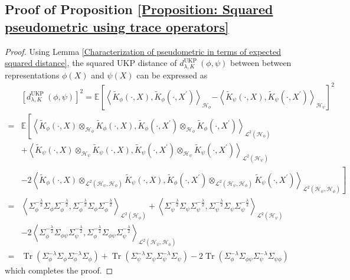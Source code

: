 \documentclass[11pt]{article}
\newcommand{\E}{\mathbb{E}}
\newcommand{\HS}{\mathcal{L}^{2}}
\newcommand{\repone}{\phi}
\newcommand{\reptwo}{\psi}
\newcommand{\Hone}{\mathcal{H}_{\phi}}
\newcommand{\Htwo}{\mathcal{H}_{\psi}}
\newcommand{\inprod}[1]{\left \langle #1 \right\rangle}
\DeclareMathOperator*{\Tr}{\text{Tr}}
\newcommand{\metricstname}{UKP }
\theoremstyle{plain}
\begin{document}
\subsection{Proof of Proposition \ref{Proposition: Squared pseudometric using trace operators}}\label{Proof of Proposition 1}

\begin{proof}
    Using Lemma \ref{Characterization of pseudometric in terms of expected squared distance}, the squared \metricstname distance of $d_{\lambda,K}^{\text{\metricstname}}(\repone,\reptwo)$ between between representations $\repone(X)$ and $\reptwo(X)$ can be expressed as
    \[
    \begin{aligned}
        &\left[d_{\lambda,K}^{\text{\metricstname}}(\repone,\reptwo)\right]^{2}
        = \E\left[ \inprod{\widetilde{K}_{\repone}(\cdot,X),\widetilde{K}_{\repone}(\cdot,X^{\prime})}_{\Hone} \right.\left.-\inprod{\widetilde{K}_{\reptwo}(\cdot,X),\widetilde{K}_{\reptwo}(\cdot,X^{\prime})}_{\Htwo}\right]^{2}\\
        =& \E\left[\inprod{\widetilde{K}_{\repone}(\cdot,X)\otimes_{\Hone}\widetilde{K}_{\repone}(\cdot,X),\widetilde{K}_{\repone}(\cdot,X^{\prime})\otimes_{\Hone}\widetilde{K}_{\repone}(\cdot,X^{\prime})}_{\HS(\Hone)}\right.\\
        &\left.+\inprod{\widetilde{K}_{\reptwo}(\cdot,X)\otimes_{\Htwo}\widetilde{K}_{\reptwo}(\cdot,X),\widetilde{K}_{\reptwo}(\cdot,X^{\prime})\otimes_{\Htwo}\widetilde{K}_{\reptwo}(\cdot,X^{\prime})}_{\HS(\Htwo)}\right.\\
        &\left.-2\left\langle\widetilde{K}_{\repone}(\cdot,X)\otimes_{\HS(\Htwo,\Hone)}\widetilde{K}_{\reptwo}(\cdot,X),\right.\right.\left.\left.\widetilde{K}_{\repone}(\cdot,X^{\prime})\otimes_{\HS(\Htwo,\Hone)}\widetilde{K}_{\reptwo}(\cdot,X^{\prime})\right\rangle_{\HS(\Htwo,\Hone)}\right]\\
        =&\inprod{\Sigma_{\repone}^{-\frac{\lambda}{2}}\Sigma_{\repone}\Sigma_{\repone}^{-\frac{\lambda}{2}},\Sigma_{\repone}^{-\frac{\lambda}{2}}\Sigma_{\repone}\Sigma_{\repone}^{-\frac{\lambda}{2}}}_{\HS(\Hone)} + \inprod{\Sigma_{\reptwo}^{-\frac{\lambda}{2}}\Sigma_{\reptwo}\Sigma_{\reptwo}^{-\frac{\lambda}{2}},\Sigma_{\reptwo}^{-\frac{\lambda}{2}}\Sigma_{\reptwo}\Sigma_{\reptwo}^{-\frac{\lambda}{2}}}_{\HS(\Htwo)}\\
        &-2\inprod{\Sigma_{\repone}^{-\frac{\lambda}{2}} \Sigma_{\repone\reptwo} \Sigma_{\reptwo}^{-\frac{\lambda}{2}} ,\Sigma_{\repone}^{-\frac{\lambda}{2}} \Sigma_{\repone\reptwo} \Sigma_{\reptwo}^{-\frac{\lambda}{2}}}_{\HS(\Htwo,\Hone)}\\
        =& \Tr\left(\Sigma_{\repone}^{-\lambda}\Sigma_{\repone}\Sigma_{\repone}^{-\lambda}\Sigma_{\repone}\right) + \Tr\left(\Sigma_{\reptwo}^{-\lambda}\Sigma_{\reptwo}\Sigma_{\reptwo}^{-\lambda}\Sigma_{\reptwo}\right)-2\Tr\left(\Sigma_{\repone}^{-\lambda}\Sigma_{\repone\reptwo}\Sigma_{\reptwo}^{-\lambda}\Sigma_{\reptwo\repone}\right)
    \end{aligned}
    \]
    which completes the proof.
\end{proof}
\end{document}
